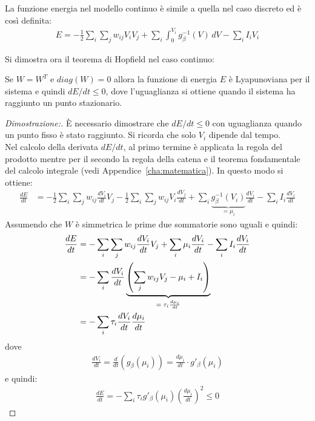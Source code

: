 		\newpage

		La funzione energia nel modello continuo è simile a quella nel caso discreto ed è così definita:
		\begin{align}
			E = - \frac{1}{2} \sum_i \sum_j w_{ij} V_i V_j + \sum_i \int_0^{V_i} g^{-1}_\beta (V) \, dV - \sum_i I_i V_i
		\end{align}

		Si dimostra ora il teorema di Hopfield nel caso continuo: 
		\begin{thm}
			Se $W=W^T$ e $diag(W) = 0$ allora la funzione di energia $E$ è Lyapunoviana per il sistema e quindi $dE / dt \leq 0$, dove l'uguaglianza si ottiene quando il sistema ha raggiunto un punto stazionario.
		\end{thm}

		\begin{proof}[Dimostrazione:]
			È necessario dimostrare che $dE / dt \leq 0$ con uguaglianza quando un punto fisso è stato raggiunto. Si ricorda che solo $V_i$ dipende dal tempo.\\
	
			Nel calcolo della derivata $dE / dt$, al primo termine è applicata la regola del prodotto mentre per il secondo la regola della catena e il teorema fondamentale del calcolo integrale (vedi Appendice~\ref{cha:matematica}). In questo modo si ottiene:
			\begin{align*}
				\frac{dE}{dt} &= - \frac{1}{2} \sum_i \sum_j w_{ij} \frac{dV_i}{dt} V_j - \frac{1}{2} \sum_i \sum_j w_{ij} V_i \frac{dV_j}{dt} + \sum_i \underbrace{g_\beta^{-1}(V_i)}_\textrm{$= \mu_i$} \frac{dV_i}{dt} - \sum_i I_i \frac{d V_i}{dt} 
			\end{align*}
			Assumendo che $W$ è simmetrica le prime due sommatorie sono uguali e quindi:
			\begin{align*}
				\frac{dE}{dt} &=  - \sum_i \sum_j w_{ij} \frac{dV_i}{dt} V_j + \sum_i \mu_i \frac{dV_i}{dt} - \sum_i I_i \frac{d V_i}{dt} \\
				&= - \sum_i \frac{d V_i}{dt} \underbrace{\left(\sum_j w_{ij} V_j - \mu_i + I_i \right)}_\textrm{$ = \tau_i \frac{d \mu_i}{dt}$} \\
				&= - \sum_i \tau_i \frac{d V_i}{dt} \frac{d \mu_i}{dt}
			\end{align*}
			dove
			\begin{align*}
				\frac{d V_i}{dt} = \frac{d}{dt} \left(g_\beta (\mu_i) \right) = \frac{d \mu_i}{dt} \cdot g'_\beta(\mu_i)
			\end{align*}
			e quindi:
			\begin{align*}
				\frac{dE}{dt} = - \sum_i \tau_i g'_\beta(\mu_i) \left(\frac{d\mu_i}{dt} \right)^2 \leq 0
			\end{align*}
	

\end{proof}

